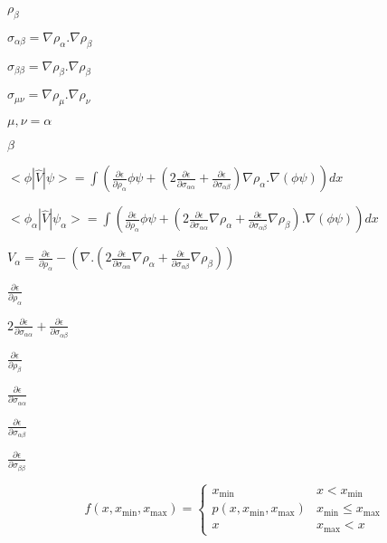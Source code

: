 \documentclass{article}
\begin{document}
$ \rho_{\beta} $
\pagebreak

$ \sigma_{\alpha\beta} = \nabla \rho_{\alpha}.\nabla \rho_{\beta} $
\pagebreak

$ \sigma_{\beta\beta} = \nabla \rho_{\beta}.\nabla \rho_{\beta} $
\pagebreak

$ \sigma_{\mu \nu} = \nabla \rho_{\mu} . \nabla \rho_{\nu} $
\pagebreak

$ \mu, \nu = \alpha$
\pagebreak

$ \beta $
\pagebreak

$ < \phi | \hat V | \psi > = \int \left( \frac{\partial \epsilon}{\partial \rho_{\alpha}} \phi \psi + \left( 2 \frac{\partial \epsilon}{\partial \sigma_{\alpha \alpha}} + \frac{\partial \epsilon}{\partial \sigma_{\alpha \beta}} \right) \nabla \rho_{\alpha} . \nabla \left( \phi \psi \right) \right) dx $
\pagebreak

$ < \phi_{\alpha} | \hat V | \psi_{\alpha} > = \int \left( \frac{\partial \epsilon}{\partial \rho_{\alpha}} \phi \psi + \left( 2 \frac{\partial \epsilon}{\partial \sigma_{\alpha \alpha}} \nabla \rho_{\alpha} + \frac{\partial \epsilon}{\partial \sigma_{\alpha \beta}} \nabla \rho_{\beta} \right) . \nabla \left( \phi \psi \right) \right) dx $
\pagebreak

$ V_{\alpha} = \frac{\partial \epsilon}{\partial \rho_{\alpha}} - \left(\nabla . \left(2 \frac{\partial \epsilon}{\partial \sigma_{\alpha \alpha}} \nabla \rho_{\alpha} + \frac{\partial \epsilon}{\partial \sigma_{\alpha \beta}} \nabla \rho_{\beta} \right) \right) $
\pagebreak

$ \frac{\partial \epsilon}{\partial \rho_{\alpha}}$
\pagebreak

$ 2 \frac{\partial \epsilon}{\partial \sigma_{\alpha \alpha}} + \frac{\partial \epsilon}{\partial \sigma_{\alpha \beta}}$
\pagebreak

$ \frac{\partial \epsilon}{\partial \rho_{\beta}}$
\pagebreak

$ \frac{\partial \epsilon}{\partial \sigma_{\alpha \alpha}} $
\pagebreak

$ \frac{\partial \epsilon}{\partial \sigma_{\alpha \beta}} $
\pagebreak

$ \frac{\partial \epsilon}{\partial \sigma_{\beta \beta}} $
\pagebreak

\[ f(x,x_{\mathrm{min}},x_{\mathrm{max}}) = \left\{ \begin{array}{ll} x_{\mathrm{min}} & x < x_{\mathrm{min}} \\ p(x,x_{\mathrm{min}},x_{\mathrm{max}}) & x_{\mathrm{min}} \leq x_{\mathrm{max}} \\ x & x_{\mathrm{max}} < x \end{array} \right. \]
\pagebreak
\end{document}
